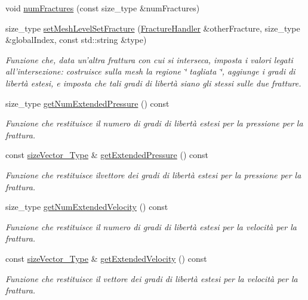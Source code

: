 \begin{DoxyCompactItemize}
\item 
void \hyperlink{classFractureHandler_a002e255a1976918ffbe6ea63b0fdae1b}{num\-Fractures} (const size\-\_\-type \&num\-Fractures)
\item 
size\-\_\-type \hyperlink{classFractureHandler_ac8cefb4c4416edc814345eb2475c8e37}{set\-Mesh\-Level\-Set\-Fracture} (\hyperlink{classFractureHandler}{Fracture\-Handler} \&other\-Fracture, size\-\_\-type \&global\-Index, const std\-::string \&type)
\begin{DoxyCompactList}\small\item\em Funzione che, data un'altra frattura con cui si interseca, imposta i valori legati all'intersezione\-: costruisce sulla mesh la regione \char`\"{} tagliata \char`\"{}, aggiunge i gradi di libertà estesi, e imposta che tali gradi di libertà siano gli stessi sulle due fratture. \end{DoxyCompactList}\item 
size\-\_\-type \hyperlink{classFractureHandler_a585b1c169be23022e25e07bd9666d18d}{get\-Num\-Extended\-Pressure} () const 
\begin{DoxyCompactList}\small\item\em Funzione che restituisce il numero di gradi di libertà estesi per la pressione per la frattura. \end{DoxyCompactList}\item 
const \hyperlink{Core_8h_a83c51913d041a5001e8683434c09857f}{size\-Vector\-\_\-\-Type} \& \hyperlink{classFractureHandler_a5d8a3c910ba9a5d156decb747040e41f}{get\-Extended\-Pressure} () const 
\begin{DoxyCompactList}\small\item\em Funzione che restituisce ilvettore dei gradi di libertà estesi per la pressione per la frattura. \end{DoxyCompactList}\item 
size\-\_\-type \hyperlink{classFractureHandler_af5b7cdadefe6993813e76fd6238b1771}{get\-Num\-Extended\-Velocity} () const 
\begin{DoxyCompactList}\small\item\em Funzione che restituisce il numero di gradi di libertà estesi per la velocità per la frattura. \end{DoxyCompactList}\item 
const \hyperlink{Core_8h_a83c51913d041a5001e8683434c09857f}{size\-Vector\-\_\-\-Type} \& \hyperlink{classFractureHandler_acfb03361fe0e1060fdf07dd997065519}{get\-Extended\-Velocity} () const 
\begin{DoxyCompactList}\small\item\em Funzione che restituisce il vettore dei gradi di libertà estesi per la velocità per la frattura. \end{DoxyCompactList}\item 

\end{DoxyCompactItemize}
